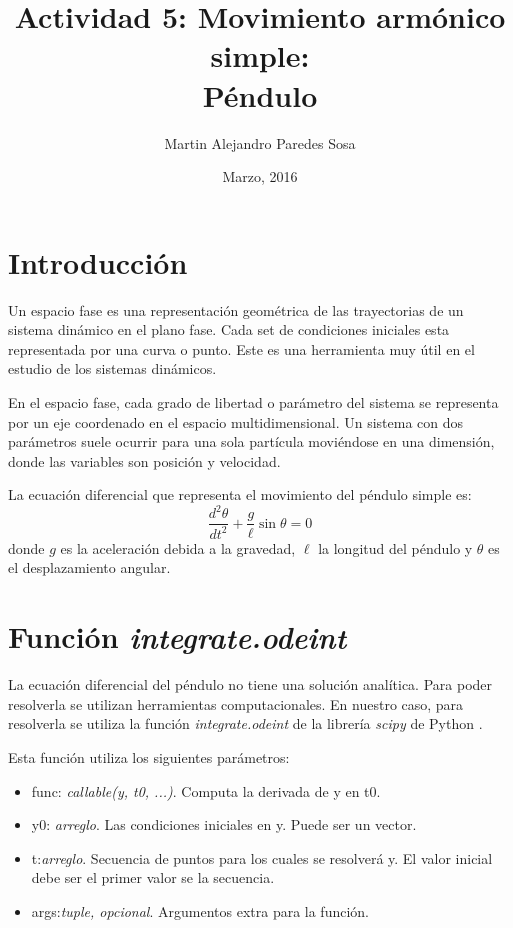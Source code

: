 \documentclass[12pt]{article}
\title{Actividad 5: Movimiento armónico simple:\\ Péndulo}
\author{Martin Alejandro Paredes Sosa}
\date{Marzo, 2016}
\begin{document}
\maketitle

\section{Introducción}
Un espacio fase es una representación geométrica de las trayectorias de un sistema dinámico en el plano fase. Cada set de condiciones iniciales esta representada por una curva o punto. Este es una herramienta muy útil en el estudio de los sistemas dinámicos.

En el espacio fase, cada grado de libertad o parámetro del sistema se representa por un eje coordenado en el espacio multidimensional. Un sistema con dos parámetros suele ocurrir para una sola partícula moviéndose en una dimensión, donde las variables son posición y velocidad.

La ecuación diferencial que representa el movimiento del péndulo simple es:
\begin{equation}\label{Pen}
	\frac{d^2\theta}{dt^2}+\frac{g}{\ell}\sin\theta=0
\end{equation}
donde $g$ es la aceleración debida a la gravedad, $\ell$ la longitud del péndulo y $\theta$ es el desplazamiento angular.


\section{Función \emph{integrate.odeint}}
La ecuación diferencial del péndulo no tiene una solución analítica. Para poder resolverla se utilizan herramientas computacionales. En nuestro caso, para resolverla se utiliza la función \emph{integrate.odeint} de la librería \emph{scipy} de Python \cite{scipy}.

Esta función utiliza los siguientes parámetros:
\begin{itemize}
	\item func: \textit{callable(y, t0, ...)}. Computa la derivada de y en t0.
	\item y0: \textit{arreglo}. Las condiciones iniciales en y. Puede ser un vector.
	\item t:\textit{arreglo}. Secuencia de puntos para los cuales se resolverá y. El valor inicial debe ser el primer valor se la secuencia.
	\item args:\textit{tuple, opcional}. Argumentos extra para la función.
\end{itemize}
\end{document}
